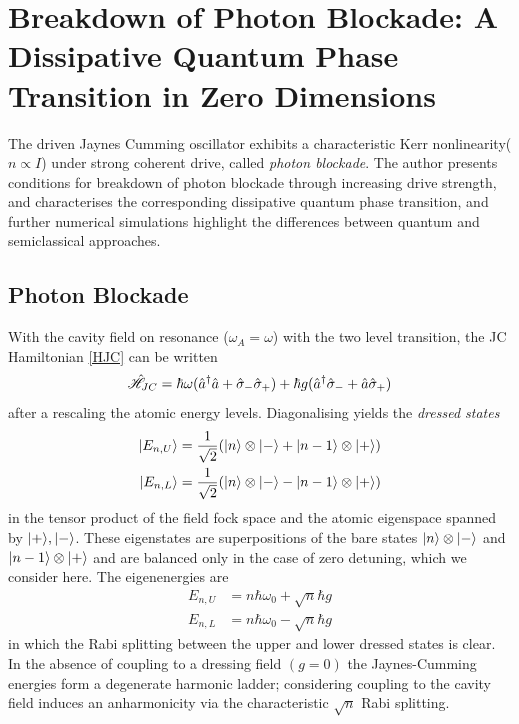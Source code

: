 
\section{Breakdown of Photon Blockade: A Dissipative Quantum Phase Transition in Zero Dimensions}
The driven Jaynes Cumming oscillator exhibits a characteristic Kerr nonlinearity($n \propto I$) under strong coherent drive, called \emph{photon blockade}\autocite{Carmichael2015}. The author presents conditions for breakdown of photon blockade through increasing drive strength, and characterises the corresponding dissipative quantum phase transition, and further numerical simulations highlight the differences between quantum and semiclassical approaches.
\subsection{Photon Blockade}
With the cavity field on resonance ($\omega_A = \omega$) with the two level transition, the JC Hamiltonian \cref{HJC} can be written\autocite[3]{Carmichael2015}
\begin{equation}
	\hat{\mathscr{H}}_{JC} = \hbar \omega (\hat{a}^\dagger \hat{a} + \hat{\sigma}_- \hat{\sigma}_+) +\hbar g (\hat{a}^\dagger \hat{\sigma}_- + \hat{a} \hat{\sigma}_+)
\end{equation}
after a rescaling the atomic energy levels. Diagonalising yields the \emph{dressed states}
\begin{align}
	| E_{n, U} \rangle & = \frac{1}{\sqrt{2}} (| n \rangle \otimes | - \rangle+| n-1 \rangle \otimes | + \rangle) \\
	| E_{n, L} \rangle & = \frac{1}{\sqrt{2}} (| n \rangle \otimes | - \rangle-| n-1 \rangle \otimes | + \rangle)
\end{align}
in the tensor product of the field fock space and the atomic eigenspace spanned by $| + \rangle, | - \rangle$. These eigenstates are superpositions of the bare states $| n \rangle \otimes | - \rangle$ and $| n-1 \rangle \otimes | + \rangle$ and are balanced only in the case of zero detuning, which we consider here. The eigenenergies are
\begin{align}
	E_{n, U} &= n \hbar \omega_0 + \sqrt{n} \hbar g \\
	E_{n, L} &= n \hbar \omega_0 - \sqrt{n} \hbar g
\end{align}
in which the Rabi splitting between the upper and lower dressed states is clear. In the absence of coupling to a dressing field $(g=0)$ the Jaynes-Cumming energies form a degenerate harmonic ladder; considering coupling to the cavity field induces an anharmonicity via the characteristic $\sqrt{n}$ Rabi splitting.

